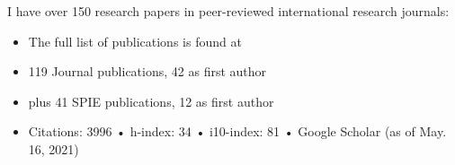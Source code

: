 
\nocite{*}


I have over 150 research papers in peer-reviewed international research journals:
\begin{itemize}
    \item The full list of publications is found at 
    \item 119
    Journal publications, 42
    as first author
    \item plus 41 SPIE publications, 12 as first author
    \item Citations: 3996  •  h-index: 34  •  i10-index: 81  •  Google Scholar (as of May. 16, 2021)



\end{itemize}





\printbibliography[heading={none}]






